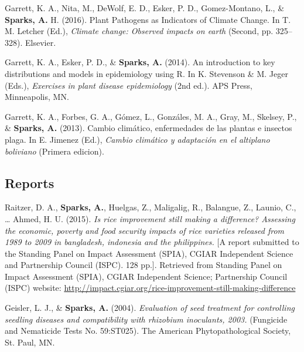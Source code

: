 \documentclass[11pt, a4paper]{awesome-cv}
\begin{document}
\leavevmode{}%
Garrett, K. A., Nita, M., DeWolf, E. D., Esker, P. D., Gomez-Montano,
L., \& \textbf{Sparks, A.} H. (2016). {Plant Pathogens as Indicators of
Climate Change}. In T. M. Letcher (Ed.), \emph{Climate change: Observed
impacts on earth} (Second, pp. 325--328). Elsevier.

\leavevmode{}%
Garrett, K. A., Esker, P. D., \& \textbf{Sparks, A.} (2014). An
introduction to key distributions and models in epidemiology using {R}.
In K. Stevenson \& M. Jeger (Eds.), \emph{Exercises in plant disease
epidemiology} (2nd ed.). APS Press, Minneapolis, MN.

\leavevmode{}%
Garrett, K. A., Forbes, G. A., Gómez, L., Gonzáles, M. A., Gray, M.,
Skelsey, P., \& \textbf{Sparks, A.} (2013). Cambio climático,
enfermedades de las plantas e insectos plaga. In E. Jimenez (Ed.),
\emph{Cambio climático y adaptación en el altiplano boliviano} (Primera
edicion).

\endgroup

\hypertarget{reports}{%
\subsection{Reports}\label{reports}}

\begingroup
\setlength{\parindent}{-0.5in}
\setlength{\leftskip}{0.5in}

\hypertarget{refs_reports}{}
\leavevmode{}%
Raitzer, D. A., \textbf{Sparks, A.}, Huelgas, Z., Maligalig, R.,
Balangue, Z., Launio, C., \ldots{} Ahmed, H. U. (2015). \emph{Is rice
improvement still making a difference? Assessing the economic, poverty
and food security impacts of rice varieties released from 1989 to 2009
in bangladesh, indonesia and the philippines.} {[}A report submitted to
the Standing Panel on Impact Assessment (SPIA), CGIAR Independent
Science and Partnership Council (ISPC). 128 pp.{]}. Retrieved from
Standing Panel on Impact Assessment (SPIA), CGIAR Independent Science;
Partnership Council (ISPC) website:
\url{http://impact.cgiar.org/rice-improvement-still-making-difference}

\leavevmode{}%
Geisler, L. J., \& \textbf{Sparks, A.} (2004). \emph{Evaluation of seed
treatment for controlling seedling diseases and compatibility with
rhizobium inoculants, 2003.} (Fungicide and Nematicide Tests No.
59:ST025). The American Phytopathological Society, St. Paul, MN.
\end{document}
